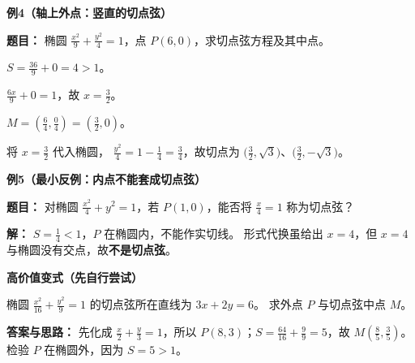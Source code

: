 \begin{examplebox}
    \medskip
    \textbf{\textcolor{CExample}{例4（轴上外点：竖直的切点弦）}}


    \textbf{题目：} 椭圆 $\frac{x^2}{9}+\frac{y^2}{4}=1$，点 $P(6,0)$，求切点弦方程及其中点。
    \begin{description}[style=nextline, leftmargin=2.8em, labelsep=0.5em, itemsep=0.35em]
        \item[\textbf{第1步：}] $S=\frac{36}{9}+0=4>1$。
        \item[\textbf{第2步：}] $\frac{6x}{9}+0=1$，故 $\boxed{x=\frac32}$。
        \item[\textbf{第3步：}] $M=(\frac 64,\frac04)=(\frac32,0)$。
        \item[\textbf{第4步（检验有两个交点）：}] 将 $x=\frac32$ 代入椭圆，
        $\frac{y^2}{4}=1-\frac14=\frac34$，故切点为
        $\bigl(\frac32,\sqrt3\bigr)$、$\bigl(\frac32,-\sqrt3\bigr)$。
    \end{description}

    \medskip
    \textbf{\textcolor{CExample}{例5（最小反例：内点不能套成切点弦）}}

    \textbf{题目：} 对椭圆 $\frac{x^2}{4}+y^2=1$，若 $P(1,0)$，能否将 $\frac{x}{4}=1$ 称为切点弦？

    \textbf{解：} $S=\frac14<1$，$P$ 在椭圆内，不能作实切线。
    形式代换虽给出 $x=4$，但 $x=4$ 与椭圆没有交点，故\textbf{不是切点弦}。

    \medskip
    \textbf{\textcolor{CExample}{高价值变式（先自行尝试）}}

    椭圆 $\frac{x^2}{16}+\frac{y^2}{9}=1$ 的切点弦所在直线为 $3x+2y=6$。
    求外点 $P$ 与切点弦中点 $M$。

    \textbf{答案与思路：} 先化成 $\frac x2+\frac y3=1$，所以
    $P(8,3)$；$S=\frac{64}{16}+\frac99=5$，故
    $\boxed{M(\frac85,\frac35)}$。检验 $P$ 在椭圆外，因为 $S=5>1$。
\end{examplebox}
